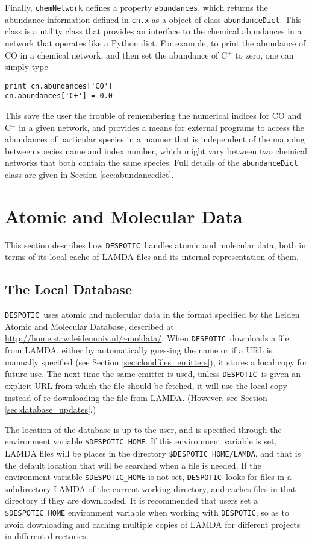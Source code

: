 \documentclass[12pt]{article}
\newcommand{\despotic}{\texttt{DESPOTIC}}
\begin{document}
Finally, \verb=chemNetwork= defines a property \verb=abundances=, which returns the abundance information defined in \verb=cn.x= as a object of class \verb=abundanceDict=. This class is a utility class that provides an interface to the chemical abundances in a network that operates like a Python dict. For example, to print the abundance of CO in a chemical network, and then set the abundance of C$^+$ to zero, one can simply type
\begin{verbatim}
print cn.abundances['CO']
cn.abundances['C+'] = 0.0
\end{verbatim}
This save the user the trouble of remembering the numerical indices for CO and C$^+$ in a given network, and provides a means for external programs to access the abundances of particular species in a manner that is independent of the mapping between species name and index number, which might vary between two chemical networks that both contain the same species. Full details of the \verb=abundanceDict= class are given in Section \ref{sec:abundancedict}.

\clearpage

\section{Atomic and Molecular Data}
\label{sec:lamda}

This section describes how \despotic\ handles atomic and molecular data, both in terms of its local cache of LAMDA files and its internal representation of them.

\subsection{The Local Database}

\despotic\ uses atomic and molecular data in the format specified by the Leiden Atomic and Molecular Database, described at \url{http://home.strw.leidenuniv.nl/~moldata/}. When \despotic\ downloads a file from LAMDA, either by automatically guessing the name or if a URL is manually specified (see Section \ref{sec:cloudfiles_emitters}), it stores a local copy for future use. The next time the same emitter is used, unless \despotic\ is given an explicit URL from which the file should be fetched, it will use the local copy instead of re-downloading the file from LAMDA. (However, see Section \ref{sec:database_updates}.)

The location of the database is up to the user, and is specified through the environment variable \verb=$DESPOTIC_HOME=. If this environment variable is set, LAMDA files will be places in the directory \verb=$DESPOTIC_HOME/LAMDA=, and that is the default location that will be searched when a file is needed. If the environment variable \verb=$DESPOTIC_HOME= is not set, \despotic\ looks for files in a subdirectory LAMDA of the current working directory, and caches files in that directory if they are downloaded. It is recommended that users set a \verb=$DESPOTIC_HOME= environment variable when working with \despotic, so as to avoid downloading and caching multiple copies of LAMDA for different projects in different directories.
\end{document}
